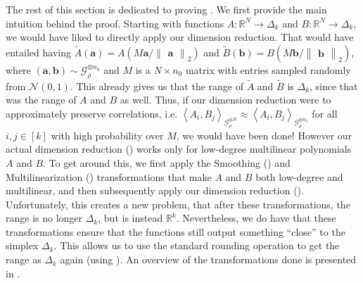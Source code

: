 \documentclass[11pt]{article}
\newcommand{\inangle}[1]{\left \langle #1 \right \rangle}
\newcommand{\norm}[2]{\begin{Vmatrix} #2 \end{Vmatrix}_{#1}}
\newcommand{\wtilde}[1]{\widetilde{#1}}
\newcommand{\bbR}{{\mathbb R}}
\newcommand{\ba}{{\bm a}}
\newcommand{\bb}{{\bm b}}
\newcommand{\calG}{\mathcal{G}}
\newcommand{\calN}{\mathcal{N}}
\begin{document}
The rest of this section is dedicated to proving . We first provide the main intuition behind the proof. Starting with functions $A : \bbR^N \to \Delta_k$ and $B: \bbR^N \to \Delta_k$, we would have liked to directly apply our dimension reduction. That would have entailed having $\wtilde{A}(\ba) = A(M\ba/\norm{2}{\ba})$ and $\wtilde{B}(\bb) = B(M\bb/\norm{2}{\bb})$, where $(\ba, \bb) \sim \calG_\rho^{\otimes n_0}$ and $M$ is a $N \times n_0$ matrix with entries sampled randomly from $\calN(0,1)$. This already gives us that the range of $\wtilde{A}$ and $\wtilde{B}$ is $\Delta_k$, since that was the range of $A$ and $B$ as well. Thus, if our dimension reduction were to approximately preserve correlations, i.e. $\inangle{A_i, B_j}_{\calG_\rho^{\otimes N}} \approx \inangle{A_i, B_j}_{\calG_\rho^{\otimes n_0}}$ for all $i, j \in [k]$ with high probability over $M$, we would have been done! However our actual dimension reduction () works only for low-degree multilinear polynomials $A$ and $B$. To get around this, we first apply the Smoothing () and Multilinearization () transformations that make $A$ and $B$ both low-degree and multilinear, and then subsequently apply our dimension reduction (). Unfortunately, this creates a new problem, that after these transformations, the range is no longer $\Delta_k$, but is instead $\bbR^k$. Nevertheless, we do have that these transformations ensure that the functions still output something ``close'' to the simplex $\Delta_k$. This allows us to use the standard rounding operation to get the range as $\Delta_k$ again (using ). An overview of the transformations done is presented in .
\end{document}

